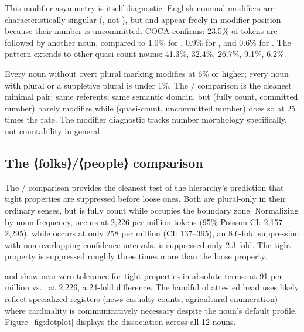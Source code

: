 \documentclass[12pt,a4paper]{article}
\DeclareRobustCommand{\mentionhead}[1]{⟨\textup{#1}⟩} %
\begin{document}
This modifier asymmetry is itself diagnostic. English nominal modifiers are characteristically singular (, not ), but  and  appear freely in modifier position because their number is uncommitted. COCA confirms: 23.5\% of  tokens are followed by another noun, compared to 1.0\% for , 0.9\% for , and 0.6\% for . The pattern extends to other quasi-count nouns:  41.3\%,  32.4\%,  26.7\%,  9.1\%,  6.2\%.

Every noun without overt plural marking modifies at 6\% or higher; every noun with plural  or a suppletive plural is under 1\%. The / comparison is the cleanest minimal pair: same referents, same semantic domain, but  (fully count, committed number) barely modifies while  (quasi-count, uncommitted number) does so at 25 times the rate. The modifier diagnostic tracks number morphology specifically, not countability in general.

\subsection{The \mentionhead{folks}/\mentionhead{people} comparison}

The / comparison provides the cleanest test of the hierarchy's prediction that tight properties are suppressed before loose ones. Both are plural-only in their ordinary senses, but  is fully count while  occupies the boundary zone. Normalizing by noun frequency,  occurs at 2{,}226 per million tokens (95\% Poisson CI: 2{,}157--2{,}295), while  occurs at only 258 per million (CI: 137--395), an 8.6-fold suppression with non-overlapping confidence intervals.  is suppressed only 2.3-fold. The tight property is suppressed roughly three times more than the loose property.

 and  show near-zero tolerance for tight properties in absolute terms:  at 91 per million vs.\  at 2{,}226, a 24-fold difference. The handful of attested head uses likely reflect specialized registers (news casualty counts, agricultural enumeration) where cardinality is communicatively necessary despite the noun's default profile. Figure~\ref{fig:dotplot} displays the dissociation across all 12 nouns.
\end{document}

